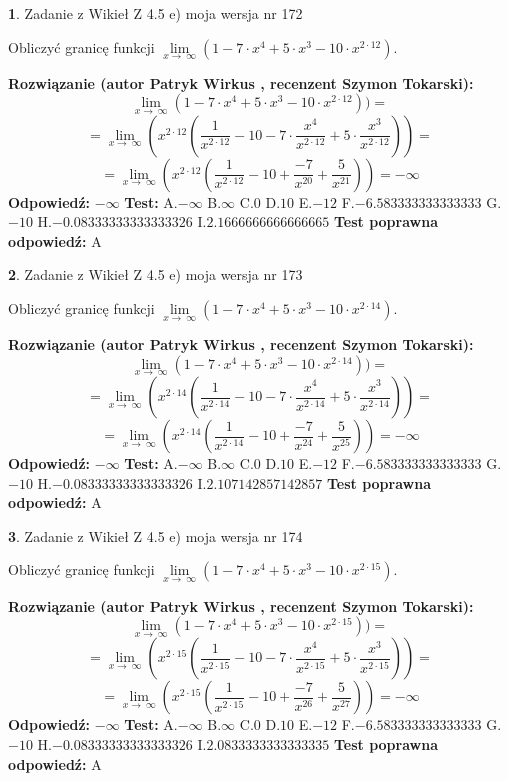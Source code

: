 \documentclass[12pt, a4paper]{article}
\theoremstyle{definition} %
\newtheorem{zad}{}
\newcommand{\zadStart}[1]{\begin{zad}#1\newline}
\newcommand{\zadStop}{\end{zad}}
\newcommand{\rozwStart}[2]{\noindent \textbf{Rozwiązanie (autor #1 , recenzent #2): }\newline}
\newcommand{\rozwStop}{\newline}
\newcommand{\odpStart}{\noindent \textbf{Odpowiedź:}\newline}
\newcommand{\odpStop}{\newline}
\newcommand{\testStart}{\noindent \textbf{Test:}\newline}
\newcommand{\testStop}{\newline}
\newcommand{\kluczStart}{\noindent \textbf{Test poprawna odpowiedź:}\newline}
\newcommand{\kluczStop}{\newline}
\begin{document}
\zadStart{Zadanie z Wikieł Z 4.5 e) moja wersja nr 172}


Obliczyć granicę funkcji  $\lim\limits_{x\to\ \infty}(1 - 7 \cdot x^{4}+5 \cdot x^{3}- 10 \cdot x^{2\cdot12})$.
\zadStop
\rozwStart{Patryk Wirkus}{Szymon Tokarski}
$$\lim\limits_{x\to\ \infty}(1 - 7 \cdot x^{4}+5 \cdot x^{3}- 10 \cdot x^{2\cdot12}))=$$
$$=\lim\limits_{x\to\ \infty}(x^{2\cdot12}(\frac{1}{x^{2\cdot12}}-10 -7 \cdot \frac{x^{4}}{x^{2\cdot12}}+5 \cdot \frac{x^{3}}{x^{2\cdot12}}))=$$
$$=\lim\limits_{x\to\ \infty}(x^{2\cdot12}(\frac{1}{x^{2\cdot12}}-10 + \frac{-7}{x^{20}}+ \frac{5}{x^{21}}))=-\infty$$
\rozwStop
\odpStart
$-\infty$
\odpStop
\testStart
A.$-\infty$ B.$\infty$ C.$0$ D.$10$ E.$-12$
F.$-6.583333333333333$ G.$-10$
H.$-0.08333333333333326$
I.$2.1666666666666665$
\testStop
\kluczStart
A
\kluczStop



\zadStart{Zadanie z Wikieł Z 4.5 e) moja wersja nr 173}


Obliczyć granicę funkcji  $\lim\limits_{x\to\ \infty}(1 - 7 \cdot x^{4}+5 \cdot x^{3}- 10 \cdot x^{2\cdot14})$.
\zadStop
\rozwStart{Patryk Wirkus}{Szymon Tokarski}
$$\lim\limits_{x\to\ \infty}(1 - 7 \cdot x^{4}+5 \cdot x^{3}- 10 \cdot x^{2\cdot14}))=$$
$$=\lim\limits_{x\to\ \infty}(x^{2\cdot14}(\frac{1}{x^{2\cdot14}}-10 -7 \cdot \frac{x^{4}}{x^{2\cdot14}}+5 \cdot \frac{x^{3}}{x^{2\cdot14}}))=$$
$$=\lim\limits_{x\to\ \infty}(x^{2\cdot14}(\frac{1}{x^{2\cdot14}}-10 + \frac{-7}{x^{24}}+ \frac{5}{x^{25}}))=-\infty$$
\rozwStop
\odpStart
$-\infty$
\odpStop
\testStart
A.$-\infty$ B.$\infty$ C.$0$ D.$10$ E.$-12$
F.$-6.583333333333333$ G.$-10$
H.$-0.08333333333333326$
I.$2.107142857142857$
\testStop
\kluczStart
A
\kluczStop



\zadStart{Zadanie z Wikieł Z 4.5 e) moja wersja nr 174}


Obliczyć granicę funkcji  $\lim\limits_{x\to\ \infty}(1 - 7 \cdot x^{4}+5 \cdot x^{3}- 10 \cdot x^{2\cdot15})$.
\zadStop
\rozwStart{Patryk Wirkus}{Szymon Tokarski}
$$\lim\limits_{x\to\ \infty}(1 - 7 \cdot x^{4}+5 \cdot x^{3}- 10 \cdot x^{2\cdot15}))=$$
$$=\lim\limits_{x\to\ \infty}(x^{2\cdot15}(\frac{1}{x^{2\cdot15}}-10 -7 \cdot \frac{x^{4}}{x^{2\cdot15}}+5 \cdot \frac{x^{3}}{x^{2\cdot15}}))=$$
$$=\lim\limits_{x\to\ \infty}(x^{2\cdot15}(\frac{1}{x^{2\cdot15}}-10 + \frac{-7}{x^{26}}+ \frac{5}{x^{27}}))=-\infty$$
\rozwStop
\odpStart
$-\infty$
\odpStop
\testStart
A.$-\infty$ B.$\infty$ C.$0$ D.$10$ E.$-12$
F.$-6.583333333333333$ G.$-10$
H.$-0.08333333333333326$
I.$2.0833333333333335$
\testStop
\kluczStart
A
\kluczStop
\end{document}
